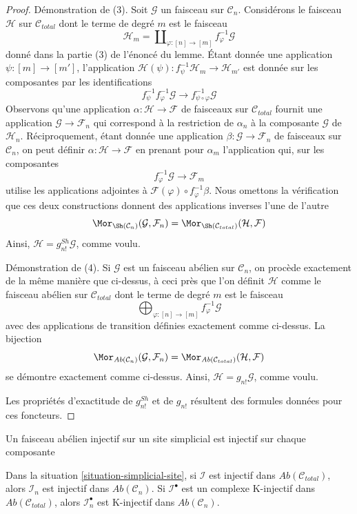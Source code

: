 \begin{proof}
\medskip\noindent
Démonstration de (3). Soit $\mathcal{G}$ un faisceau sur $\mathcal{C}_n$.
Considérons le faisceau $\mathcal{H}$ sur $\mathcal{C}_{total}$
dont le terme de degré $m$ est le faisceau
$$
\mathcal{H}_m = \coprod\nolimits_{\varphi : [n] \to [m]}
f_\varphi^{-1}\mathcal{G}
$$
donné dans la partie (3) de l'énoncé du lemme.
Étant donnée une application $\psi : [m] \to [m']$, l'application
$\mathcal{H}(\psi) : f_\psi^{-1}\mathcal{H}_m \to \mathcal{H}_{m'}$
est donnée sur les composantes par les identifications
$$
f_\psi^{-1} f_\varphi^{-1} \mathcal{G} \to
f_{\psi \circ \varphi}^{-1}\mathcal{G}
$$
Observons qu'une application $\alpha : \mathcal{H} \to \mathcal{F}$
de faisceaux sur $\mathcal{C}_{total}$ fournit une application
$\mathcal{G} \to \mathcal{F}_n$
qui correspond à la restriction de $\alpha_n$ à la composante
$\mathcal{G}$ de $\mathcal{H}_n$. Réciproquement, étant donnée une application
$\beta : \mathcal{G} \to \mathcal{F}_n$ de faisceaux sur $\mathcal{C}_n$,
on peut définir
$\alpha : \mathcal{H} \to \mathcal{F}$ en prenant pour $\alpha_m$
l'application qui, sur les composantes
$$
f_\varphi^{-1}\mathcal{G} \to \mathcal{F}_m
$$
utilise les applications adjointes à $\mathcal{F}(\varphi) \circ f_\varphi^{-1}\beta$.
Nous omettons la vérification que ces deux constructions donnent
des applications inverses l'une de l'autre
$$
\Mor_{\Sh(\mathcal{C}_n)}(\mathcal{G}, \mathcal{F}_n) =
\Mor_{\Sh(\mathcal{C}_{total})}(\mathcal{H}, \mathcal{F})
$$
Ainsi, $\mathcal{H} = g^{Sh}_{n!}\mathcal{G}$, comme voulu.

\medskip\noindent
Démonstration de (4). Si $\mathcal{G}$ est un faisceau abélien sur $\mathcal{C}_n$,
on procède exactement de la même manière que ci-dessus, à ceci près que
l'on définit $\mathcal{H}$ comme le faisceau abélien sur $\mathcal{C}_{total}$
dont le terme de degré $m$ est le faisceau
$$
\bigoplus\nolimits_{\varphi : [n] \to [m]} f_\varphi^{-1}\mathcal{G}
$$
avec des applications de transition définies exactement comme ci-dessus. La bijection
$$
\Mor_{\textit{Ab}(\mathcal{C}_n)}(\mathcal{G}, \mathcal{F}_n) =
\Mor_{\textit{Ab}(\mathcal{C}_{total})}(\mathcal{H}, \mathcal{F})
$$
se démontre exactement comme ci-dessus.
Ainsi, $\mathcal{H} = g_{n!}\mathcal{G}$, comme voulu.

\medskip\noindent
Les propriétés d'exactitude de $g^{Sh}_{n!}$ et de $g_{n!}$ résultent
des formules données pour ces foncteurs.
\end{proof}

\begin{lemma}
\label{lemma-restriction-injective-to-component-site}
\begin{slogan}
Un faisceau abélien injectif sur un site simplicial est injectif sur chaque composante
\end{slogan}
Dans la situation \ref{situation-simplicial-site},
si $\mathcal{I}$ est injectif dans $\textit{Ab}(\mathcal{C}_{total})$,
alors $\mathcal{I}_n$ est injectif dans $\textit{Ab}(\mathcal{C}_n)$.
Si $\mathcal{I}^\bullet$ est un complexe K-injectif dans
$\textit{Ab}(\mathcal{C}_{total})$,
alors $\mathcal{I}_n^\bullet$ est K-injectif dans $\textit{Ab}(\mathcal{C}_n)$.
\end{lemma}

